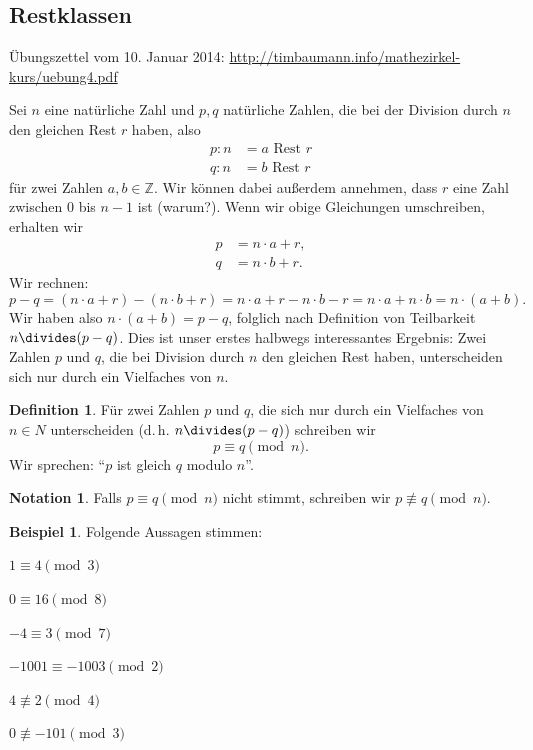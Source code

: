 \documentclass[a4paper,ngerman,12pt]{scrartcl}
\newcommand{\Z}{\mathbb{Z}}
\theoremstyle{definition}
\newtheorem{defn}{Definition}
\newtheorem*{nota}{Notation}
\newtheorem*{bsp}{Beispiel}
\begin{document}
\subsection{Restklassen}

Übungszettel vom 10. Januar 2014: \mbox{\url{http://timbaumann.info/mathezirkel-kurs/uebung4.pdf}}

Sei $n$ eine natürliche Zahl und $p, q$ natürliche Zahlen, die bei der Division durch $n$ den gleichen Rest $r$ haben, also
\begin{align*}
  p : n &= a \text{ Rest } r \\
  q : n &= b \text{ Rest } r
\end{align*}
für zwei Zahlen $a, b \in \Z$. Wir können dabei außerdem annehmen, dass $r$ eine Zahl zwischen $0$ bis $n - 1$ ist (warum?). Wenn wir obige Gleichungen umschreiben, erhalten wir
\begin{align*}
  p &= n \cdot a + r, \\
  q &= n \cdot b + r.
\end{align*}
Wir rechnen:
\[ p - q = (n \cdot a + r) - (n \cdot b + r) = n \cdot a + r - n \cdot b - r = n \cdot a + n \cdot b = n \cdot (a + b). \]
Wir haben also $n \cdot (a+b) = p - q$, folglich nach Definition von Teilbarkeit $n \divides (p - q)$. Dies ist unser erstes halbwegs interessantes Ergebnis: Zwei Zahlen $p$ und $q$, die bei Division durch $n$ den gleichen Rest haben, unterscheiden sich nur durch ein Vielfaches von $n$.

\begin{defn}
  Für zwei Zahlen $p$ und $q$, die sich nur durch ein Vielfaches von $n \in N$ unterscheiden (d.\,h. $n \divides (p-q)$) schreiben wir
  \[ p \equiv q \pmod{n}. \]
  Wir sprechen: "`$p$ ist gleich $q$ modulo $n$"'.
\end{defn}

\begin{nota}
  Falls $p \equiv q \pmod{n}$ nicht stimmt, schreiben wir $p \not\equiv q \pmod{n}$.
\end{nota}

\begin{bsp}
  Folgende Aussagen stimmen:
  \begin{itemize}
    \begin{multicols}{3}
      \item $1 \equiv 4 \pmod{3}$
      \item $0 \equiv 16 \pmod{8}$
      \item $-4 \equiv 3 \pmod{7}$
      \item $-1001 \equiv -1003 \pmod{2}$
      \item $4 \not\equiv 2 \pmod{4}$
      \item $0 \not\equiv -101 \pmod{3}$
    \end{multicols}
  \end{itemize}
\end{bsp}
\end{document}
